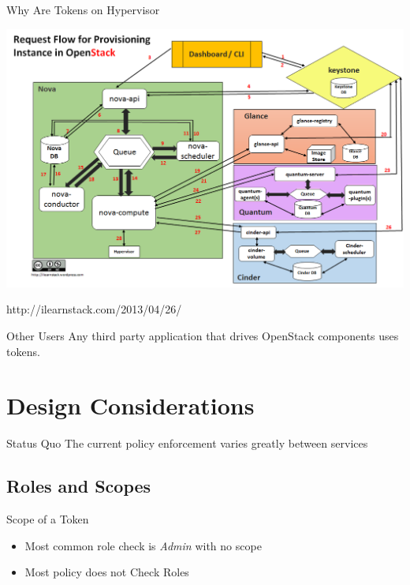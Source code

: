 \documentclass{beamer}
\begin{document}
\begin{frame}{Why Are Tokens on Hypervisor}
  \begin{block}{}
    \includegraphics[scale=0.3]{request-flow1.png}
  \end{block}
  http://ilearnstack.com/2013/04/26/
\end {frame}

\begin{frame}{Other Users}
  Any third party application that drives OpenStack components uses tokens.
\end {frame}


\section {Design Considerations}


\begin{frame}{Status Quo}
  The current policy enforcement  varies greatly between services
\end {frame}


\subsection {Roles and Scopes}

\begin{frame}{Scope of a Token}
  \begin{itemize}
  \item Most common role check is \textit{Admin} with no scope
  \item Most policy does not Check Roles
  \end{itemize}
\end {frame}
\end{document}

